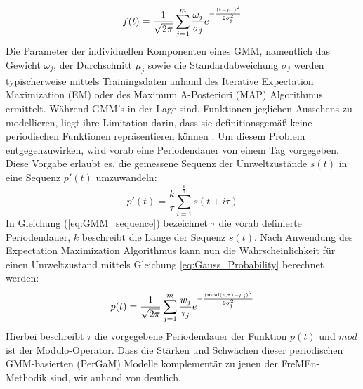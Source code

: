 \begin{equation}
	f(t) = \frac{1}{\sqrt{2 \pi}} \sum_{j=1}^{m} \frac{\omega_j}{\sigma_j} e^{\mathrm{- \frac{(t- \mu_j)^2}{2 \sigma_j ^2}}}
	\label{eq:Gaussian_Mixture_Models}
\end{equation}
Die Parameter der individuellen Komponenten eines GMM, namentlich das Gewicht $\omega_j$, der Durchschnitt $\mu_j$ sowie die Standardabweichung $\sigma_j$ werden typischerweise mittels Trainingsdaten anhand des Iterative Expectation Maximization (EM) oder des Maximum A-Posteriori (MAP) Algorithmus ermittelt. Während GMM's in der Lage sind, Funktionen jeglichen Aussehens zu modellieren, liegt ihre Limitation darin, dass sie definitionsgemäß keine periodischen Funktionen repräsentieren können \cite{Krajnik.2015b}. Um diesem Problem entgegenzuwirken, wird vorab eine Periodendauer von einem Tag vorgegeben. Diese Vorgabe erlaubt es, die gemessene Sequenz der Umweltzustände $s(t)$  in eine Sequenz $p'(t)$ umzuwandeln:
\begin{equation}
	p'(t) = \frac{k}{\tau} \sum_{i=1}^{\frac{k}{\tau}} s(t+i \tau)
	\label{eq:GMM_sequence}
\end{equation}
In Gleichung (\ref{eq:GMM_sequence}) bezeichnet $\tau$ die vorab definierte Periodendauer, $k$ beschreibt die Länge der Sequenz $s(t)$. Nach Anwendung des Expectation Maximization Algorithmus kann nun die Wahrscheinlichkeit für einen Umweltzustand mittels Gleichung \ref{eq:Gauss_Probability} berechnet werden: 
\begin{equation}
	p(t) = \frac{1}{\sqrt{2 \pi}} \sum_{j=1}^{m} \frac{w_j}{\tau_j} e ^{\mathrm{- \frac{(mod(t,\tau) - \mu_j)^2}{2 \sigma_j^2}}}
	\label{eq:Gauss_Probability}
\end{equation}
Hierbei beschreibt $\tau$ die vorgegebene Periodendauer der Funktion $p(t)$ und $mod$ ist der Modulo-Operator. Dass die Stärken und Schwächen dieser periodischen GMM-basierten (PerGaM) Modelle komplementär zu jenen der FreMEn-Methodik sind, wir anhand von  deutlich.
